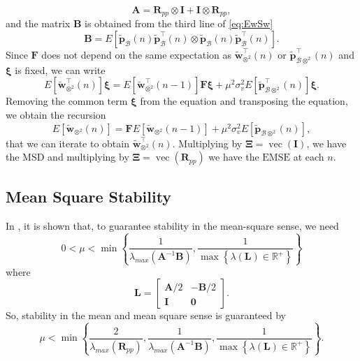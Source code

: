 \begin{equation*}
    \mathbf{A} = \mathbf{R}_{pp}\otimes\mathbf{I} + \mathbf{I}\otimes\mathbf{R}_{pp},
\end{equation*}
and the matrix $\mathbf{B}$ is obtained from the third line of \eqref{eq:EwSw}
\begin{equation*}
    \mathbf{B} = E\left[ \tilde{\mathbf{p}}_\mathcal{B}(n)\tilde{\mathbf{p}}^\top_\mathcal{B}(n) \otimes \tilde{\mathbf{p}}_\mathcal{B}(n)\tilde{\mathbf{p}}^\top_\mathcal{B}(n)\right].
\end{equation*}
Since $\mathbf{F}$ does not depend on the same expectation as $\tilde{\mathbf{w}}^\top_{\otimes^2}(n)$ or $\tilde{\mathbf{p}}^\top_{\mathcal{B}\otimes^2}(n)$ and $\boldsymbol{\xi}$ is fixed, we can write
\begin{equation}
    E\left[ \tilde{\mathbf{w}}^\top_{\otimes^2}(n)\right] \boldsymbol{\xi} = E\left[ \tilde{\mathbf{w}}^\top_{\otimes^2}(n-1) \right]\mathbf{F}\boldsymbol{\xi} +\mu^2 \sigma_{v}^2E\left[ \tilde{\mathbf{p}}^\top_{\mathcal{B}\otimes^2}(n) \right]\boldsymbol{\xi}.
\end{equation}
Removing the common term $\boldsymbol{\xi}$ from the equation and transposing the equation, we obtain the recursion
\begin{equation}
    E\left[ \tilde{\mathbf{w}}_{\otimes^2}(n)\right]  = \mathbf{F}E\left[ \tilde{\mathbf{w}}_{\otimes^2}(n-1) \right] +\mu^2 \sigma_{v}^2E\left[ \tilde{\mathbf{p}}_{\mathcal{B}\otimes^2}(n) \right],\label{eq:Ewkron2_last}
\end{equation}
that we can iterate to obtain $\tilde{\mathbf{w}}^\top_{\otimes^2}(n)$. Multiplying by $\boldsymbol{\Xi} = \operatorname{vec}(\mathbf{I})$, we have the $\text{MSD}$ and multiplying by $\boldsymbol{\Xi} = \operatorname{vec}(\mathbf{R}_{pp})$ we have the $\text{EMSE}$ at each $n$.

\subsection{Mean Square Stability}

In \cite{al-naffouri_transient_2003}, it is shown that, to guarantee stability in the mean-square sense, we need
\begin{equation}
    0<\mu<\min \left\{\frac{1}{\lambda_{max}(\mathbf{A}^{-1}\mathbf{B})},\frac{1}{\max\left\{\lambda(\mathbf{L})\in\mathbb{R}^{+}\right\}} \right\}
\end{equation}
where
\begin{equation}
    \mathbf{L} = \begin{bmatrix}
        \mathbf{A}/2 & -\mathbf{B}/2\\
        \mathbf{I} & \mathbf{0}
    \end{bmatrix}.
\end{equation}
So, stability in the mean and mean square sense is guaranteed by
\begin{equation}
    \mu<\min \left\{\frac{2}{\lambda_{max}(\mathbf{R}_{pp})},\frac{1}{\lambda_{max}(\mathbf{A}^{-1}\mathbf{B})},\frac{1}{\max\left\{\lambda(\mathbf{L})\in\mathbb{R}^{+}\right\}} \right\}.
\end{equation}

